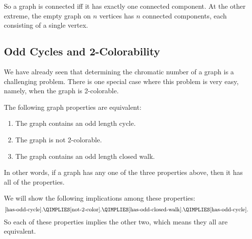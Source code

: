 So a graph is connected iff it has exactly one connected component.
At the other extreme, the empty graph on $n$ vertices has $n$
connected components, each consisting of a single vertex.

\subsection{Odd Cycles and 2-Colorability}\label{subsec:odd_cycles}

We have already seen that determining the chromatic number of a graph is a
challenging problem.  There is one special case where this problem is very
easy, namely, when the graph is 2-colorable.

\begin{theorem}\label{thm:2-colorable-equiv}
The following graph properties are equivalent:

\begin{enumerate}

\item\label{has-odd-cycle}
The graph contains an odd length cycle.

\item\label{not-2-color}
The graph is not 2-colorable.

\item\label{has-odd-closed-walk}
The graph contains an odd length closed walk.

\end{enumerate}
\end{theorem}
In other words, if a graph has any one of the three properties above,
then it has all of the properties.

We will show the following implications among these properties:
\[
\text{\ref{has-odd-cycle}.} \QIMPLIES \text{\ref{not-2-color}.} \QIMPLIES
\text{\ref{has-odd-closed-walk}.} \QIMPLIES
\text{\ref{has-odd-cycle}}.
\]
So each of these properties implies the other two, which means they
all are equivalent.
\iffalse
\footnote{Mutual implication follows from transivity of implication,
  Rule~\ref{rule:transitivity} in Section~\ref{sec:logical_deduction}}
\fi


